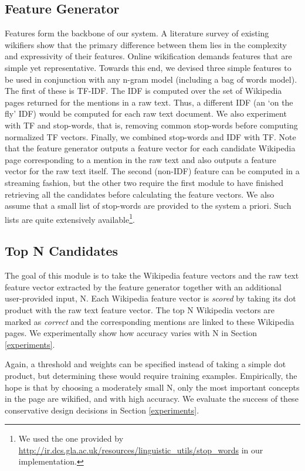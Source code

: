 \subsection{Feature Generator}
Features form the backbone of our system. A literature survey of existing wikifiers show that the primary difference between them lies in the complexity and expressivity of their features. Online wikification demands features that are simple yet representative. Towards this end, we devised three simple features to be used in conjunction with any n-gram model (including a bag of words model). The first of these is TF-IDF. The IDF is computed over the set of Wikipedia pages returned for the mentions in a raw text. Thus, a different IDF (an `on the fly' IDF) would be computed for each raw text document. We also experiment with TF and stop-words, that is, removing common stop-words before computing normalized TF vectors. Finally, we combined stop-words and IDF with TF. Note that the feature generator outputs a feature vector for each candidate Wikipedia page corresponding to a mention in the raw text and also outputs a feature vector for the raw text itself. The second (non-IDF) feature can be computed in a streaming fashion, but the other two require the first module to have finished retrieving all the candidates before calculating the feature vectors. We also assume that a small list of stop-words are provided to the system a priori. Such lists are quite extensively available\footnote{We used the one provided by \url{http://ir.dcs.gla.ac.uk/resources/linguistic_utils/stop_words} in our implementation.}. 
\subsection{Top N Candidates}
The goal of this module is to take the Wikipedia feature vectors and the raw text feature vector extracted by the feature generator  together with an additional user-provided input, N. Each Wikipedia feature vector is \emph{scored} by taking its dot product with the raw text feature vector. The top N Wikipedia vectors are marked as \emph{correct} and the corresponding mentions are linked to these Wikipedia pages. We experimentally show how accuracy varies with N in Section \ref{experiments}. 

Again, a threshold and weights can be specified instead of taking a simple dot product, but determining these would require training examples. Empirically, the hope is that by choosing a moderately small N, only the most important concepts in the page are wikified, and with high accuracy. We evaluate the success of these conservative design decisions in Section \ref{experiments}.


